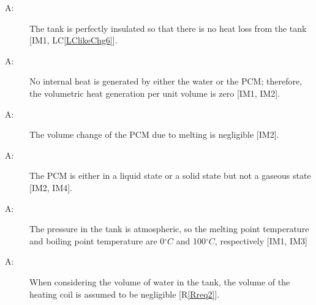 \documentclass[12pt]{article}
\newcounter{assumpnum}
\newcommand{\atheassumpnum}{A\theassumpnum}
\begin{document}
\begin{description}
\item[\atheassumpnum\label{Aassump15}:]The tank is perfectly insulated so that there is no heat loss from the tank [IM1, LC\ref{LClikeChg6}].
\end{description}
\begin{description}
\item[\atheassumpnum\label{Aassump16}:]No internal heat is generated by either the water or the PCM; therefore, the volumetric heat generation per unit volume is zero [IM1, IM2].
\end{description}
\begin{description}
\item[\atheassumpnum\label{Aassump17}:]The volume change of the PCM due to melting is negligible [IM2].
\end{description}
\begin{description}
\item[\atheassumpnum\label{Aassump18}:]The PCM is either in a liquid state or a solid state but not a gaseous state [IM2, IM4].
\end{description}
\begin{description}
\item[\atheassumpnum\label{Aassump19}:]The pressure in the tank is atmospheric, so the melting point temperature and boiling point temperature are 0${}^{\circ}C$ and 100${}^{\circ}C$, respectively [IM1, IM3]
\end{description}
\begin{description}
\item[\atheassumpnum\label{Aassump20}:]When considering the volume of water in the tank, the volume of the heating coil is assumed to be negligible [R\ref{Rreq2}].
\end{description}
\end{document}
